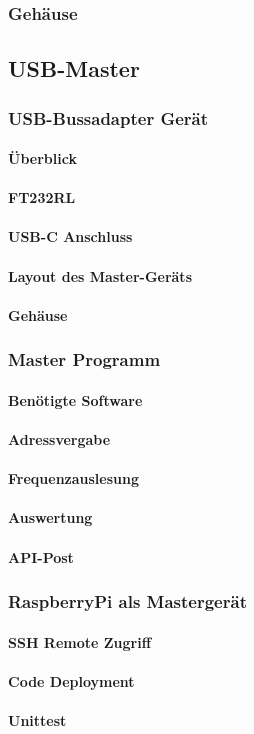 \subsubsection{Gehäuse}


\subsection{USB-Master}
\subsubsection{USB-Bussadapter Gerät}
\paragraph{Überblick}
\paragraph{FT232RL}
\paragraph{USB-C Anschluss}
\paragraph{Layout des Master-Geräts}
\paragraph{Gehäuse}

\subsubsection{Master Programm}
\paragraph{Benötigte Software}
\paragraph{Adressvergabe}
\paragraph{Frequenzauslesung}

\paragraph{Auswertung}
\paragraph{API-Post}

\subsubsection{RaspberryPi als Mastergerät}
\paragraph{SSH Remote Zugriff}
\paragraph{Code Deployment}
\paragraph{Unittest}

\pagebreak


